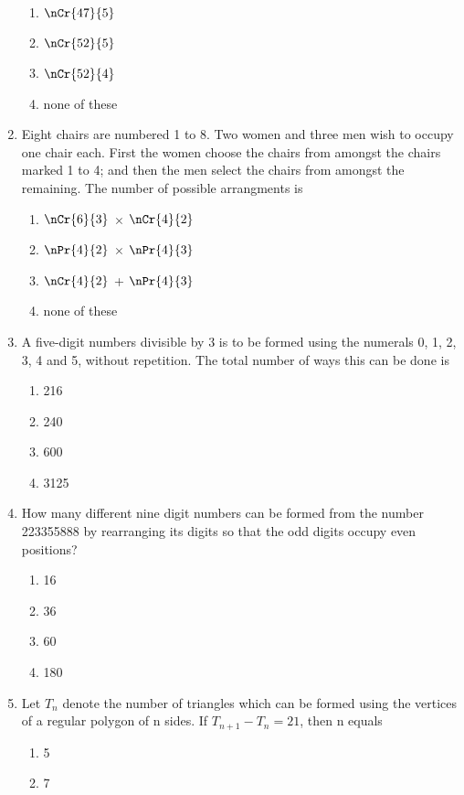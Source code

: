 \begin{enumerate}[label=\arabic*.,ref=\thesubsection.\theenumi]
\begin{enumerate}
\item $\nCr{47}{5}$
\item $\nCr{52}{5}$
\item $\nCr{52}{4}$
\item none of these\\
\end{enumerate} 
\item Eight chairs are numbered 1 to 8. Two women and three men wish to occupy one chair each. First the women choose the chairs from amongst the chairs marked 1 to 4; and then the men select the chairs from amongst the remaining. The number of possible arrangments is
\begin{enumerate}
\item $\nCr{6}{3}$ $\times$ $\nCr{4}{2}$
\item $\nPr{4}{2}$ $\times$ $\nPr{4}{3}$
\item $\nCr{4}{2}$ + $\nPr{4}{3}$
\item none of these\\
\end{enumerate}
\item A five-digit numbers divisible by 3 is to be formed using the numerals 0, 1, 2, 3, 4 and 5, without repetition. The total number of ways this can be done is
\begin{enumerate}
\item 216
\item 240
\item 600
\item 3125\\
\end{enumerate}
\item How many different nine digit numbers can be formed from the number 223355888 by rearranging its digits so that the odd digits occupy even positions?
\begin{enumerate}
\item 16
\item 36
\item 60
\item 180\\
\end{enumerate}
\item Let $T_n$ denote the number of triangles which can be formed using the vertices of a regular polygon of n sides. If $T_{n+1}-T_n = 21$, then n equals
\begin{enumerate}
\item 5
\item 7

\end{enumerate}
\end{enumerate}
